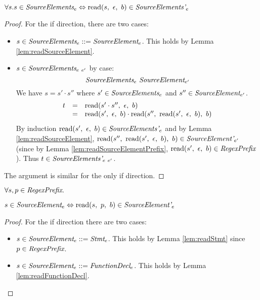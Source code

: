 \documentclass[preprint,10pt]{sigplanconf}
\begin{document}
\begin{lemma}\mbox{}

  \( \forall s. s \in \textit{SourceElements}_{e} \Leftrightarrow 
  \textrm{read}(s,~\epsilon,~b) \in \textit{SourceElements'}_{e} \)
\end{lemma}
\begin{proof}
  For the if direction, there are two cases:
  \begin{itemize}
  \item \( s \in \textit{SourceElements}_{e} ::=
    \textit{SourceElement}_{e} \). This holds by Lemma
    \ref{lem:readSourceElement}.
    
  \item \( s \in \textit{SourceElements}_{e~e'} \) by case:
    \[
    \textit{SourceElements}_{e}~\textit{SourceElement}_{e'} 
    \] 
    We have
    \( s = s' \cdot s'' \) where \( s' \in \textit{SourceElements}_{e}
    \) and \( s'' \in \textit{SourceElement}_{e'} \).
    \[
    \begin{array}{rcl}
      t &=& \textrm{read}(s'\cdot s'',~\epsilon,~b)
      \\
      &=& \textrm{read}(s',~\epsilon,~b)\cdot \textrm{read}(s'',~\textrm{read}(s',~\epsilon,~b),~b)
    \end{array}
    \]
    By induction \( \textrm{read}(s',~\epsilon,~b) \in
    \textit{SourceElements'}_{e} \) and by Lemma
    \ref{lem:readSourceElement}, \( \textrm{read}(s'',~
      \textrm{read}(s',~\epsilon,~b),~b) \in \textit{SourceElement'}_{e'} \) (since
    by Lemma \ref{lem:readSourceElementPrefix}, \( 
    \textrm{read}(s',~\epsilon,~b) \in \textit{RegexPrefix} \)). Thus \( t \in
    \textit{SourceElements'}_{e~e'} \).
  \end{itemize}
  
  The argument is similar for the only if direction.
\end{proof}


\begin{lemma}\mbox{}
  
  \( \forall s, p \in \textit{RegexPrefix}. \)

  \( s \in \textit{SourceElement}_{e} \Leftrightarrow 
  \textrm{read}(s,~p,~b) \in \textit{SourceElement'}_{e} \)
\end{lemma}
\begin{proof}
  For the if direction there are two cases:
  \begin{itemize}
  \item \( s \in \textit{SourceElement}_{e} ::= \textit{Stmt}_{e} \).
    This holds by Lemma \ref{lem:readStmt} since \( p \in \textit{RegexPrefix} \).
    
  \item \( s \in \textit{SourceElement}_{e} ::=
    \textit{FunctionDecl}_{e} \). This holds by Lemma
    \ref{lem:readFunctionDecl}.
  \end{itemize}
\end{proof}
\end{document}
